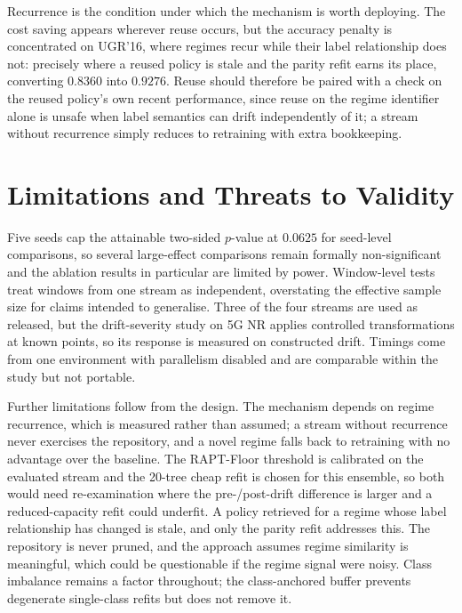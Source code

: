 \documentclass[conference]{IEEEtran}
\begin{document}
Recurrence is the condition under which the mechanism is worth deploying. The cost
saving appears wherever reuse occurs, but the accuracy penalty is concentrated on
UGR'16, where regimes recur while their label relationship does not: precisely where a
reused policy is stale and the parity refit earns its place, converting $0.8360$ into
$0.9276$. Reuse should therefore be paired with a check on the reused policy's own
recent performance, since reuse on the regime identifier alone is unsafe when label
semantics can drift independently of it; a stream without recurrence simply reduces to
retraining with extra bookkeeping.

\section{Limitations and Threats to Validity}
\label{sec:limitations}

Five seeds cap the attainable two-sided $p$-value at $0.0625$ for seed-level
comparisons, so several large-effect comparisons remain formally non-significant and
the ablation results in particular are limited by power. Window-level tests treat
windows from one stream as independent, overstating the effective sample size for
claims intended to generalise. Three of the four streams are used as released, but
the drift-severity study on 5G NR applies controlled transformations at known points,
so its response is measured on constructed drift. Timings come from one environment
with parallelism disabled and are comparable within the study but not portable.

Further limitations follow from the design. The mechanism depends on regime
recurrence, which is measured rather than assumed; a stream without recurrence never
exercises the repository, and a novel regime falls back to retraining with no
advantage over the baseline. The RAPT-Floor threshold is calibrated on the evaluated
stream and the 20-tree cheap refit is chosen for this ensemble, so both would need
re-examination where the pre-/post-drift difference is larger and a reduced-capacity
refit could underfit. A policy retrieved for a regime whose label relationship has
changed is stale, and only the parity refit addresses this. The repository is never
pruned, and the approach assumes regime similarity is meaningful, which could be
questionable if the regime signal were noisy. Class imbalance remains a factor
throughout; the class-anchored buffer prevents degenerate single-class refits but does
not remove it.
\end{document}
